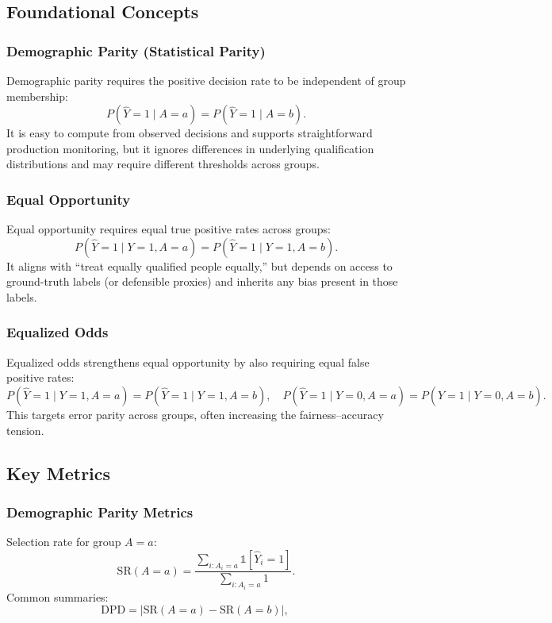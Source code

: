\begin{TNtwocol}
\subsection*{Foundational Concepts}

\subsubsection*{Demographic Parity (Statistical Parity)}
Demographic parity requires the positive decision rate to be independent of group membership:
\[
P(\hat{Y}=1 \mid A=a)=P(\hat{Y}=1 \mid A=b).
\]
It is easy to compute from observed decisions and supports straightforward production monitoring, but it ignores differences in underlying qualification distributions and may require different thresholds across groups.

\subsubsection*{Equal Opportunity}
Equal opportunity requires equal true positive rates across groups:
\[
P(\hat{Y}=1 \mid Y=1, A=a)=
P(\hat{Y}=1 \mid Y=1, A=b).
\]
It aligns with ``treat equally qualified people equally,'' but depends on access to ground-truth labels (or defensible proxies) and inherits any bias present in those labels.

\subsubsection*{Equalized Odds}
Equalized odds strengthens equal opportunity by also requiring equal false positive rates:
\[
P(\hat{Y}=1 \mid Y=1, A=a)=
P(\hat{Y}=1 \mid Y=1, A=b), \quad
P(\hat{Y}=1 \mid Y=0, A=a)=
P(\hat{Y}=1 \mid Y=0, A=b).
\]
This targets error parity across groups, often increasing the fairness--accuracy tension.

\subsection*{Key Metrics}

\subsubsection*{Demographic Parity Metrics}
Selection rate for group $A=a$:
\[
\text{SR}(A=a)=
\frac{\sum_{i: A_i=a}\mathbb{1}[\hat{Y}_i=1]}{\sum_{i: A_i=a}1}.
\]
Common summaries:
\[
\text{DPD}=\left|\text{SR}(A=a)-\text{SR}(A=b)\right|, \qquad

\]
\end{TNtwocol}
